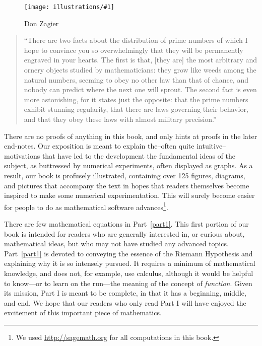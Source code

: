 \documentclass[openany]{book}
\newcommand{\ill}[3]{%
   \begin{figure}[H]%
   \vspace{-2ex}
   \centering%
   \texttt{[image: illustrations/\#1]}%
   \caption{#3}%
   \vspace{-2ex}
    \end{figure}}
\theoremstyle{plain}
\theoremstyle{definition}
\begin{document}
\ill{zagier}{.25}{Don Zagier}


\begin{quote}
  ``There are two facts about the distribution of prime numbers of
  which I hope to convince you so overwhelmingly that they will be
  permanently engraved in your hearts. The first is that, [they are]
  the most arbitrary and ornery objects studied by mathematicians:
  they grow like weeds among the natural numbers, seeming to obey no
  other law than that of chance, and nobody can predict where the next
  one will sprout. The second fact is even more astonishing, for it
  states just the opposite: that the prime numbers exhibit stunning
  regularity, that there are laws governing their behavior, and that
  they obey these laws with almost military precision.''
\end{quote}


There are no proofs of anything in this book, and only hints at proofs in the later end-notes. Our exposition is meant to explain the--often quite intuitive-- motivations that have led to the development the fundamental ideas of the subject, as buttressed by numerical experiments, often displayed as graphs. As a result, our book is profusely illustrated, containing over 125 figures,
diagrams, and pictures that accompany the text  in hopes that readers themselves become inspired to make some numerical experimentation. This will surely become easier for people to do  as mathematical software
advances\footnote{We used \url{http://sagemath.org}
for all computations in this book.}.


  There are  few
mathematical equations in Part~\ref{part1}.  This first portion of our book is intended for readers who are generally interested in, or curious about, mathematical ideas, but who may not have studied any advanced topics. Part~\ref{part1} is devoted to conveying the essence of the Riemann Hypothesis and explaining why it is so intensely pursued. It requires a minimum of mathematical knowledge, and does not,  for example, use calculus, although it would be helpful to know---or to learn on the run---the meaning of  the concept of {\it function}. Given its mission, Part I is meant to be complete, in that it has a beginning, middle, and end.  We hope that our readers who only read Part I will have enjoyed the excitement  of this important piece of mathematics.
\end{document}
